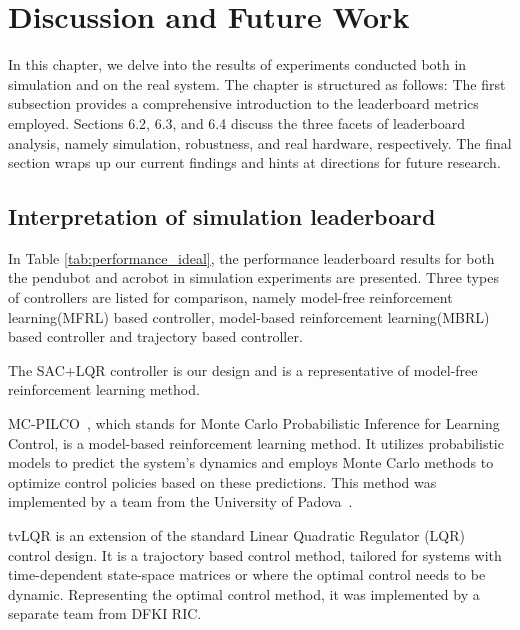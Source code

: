 \chapter{Discussion and Future Work}
In this chapter, we delve into the results of experiments conducted both in simulation and on the real system. The chapter is structured as follows: The first subsection provides a comprehensive introduction to the leaderboard metrics employed. Sections 6.2, 6.3, and 6.4 discuss the three facets of leaderboard analysis, namely simulation, robustness, and real hardware, respectively. The final section wraps up our current findings and hints at directions for future research.

\section{Interpretation of simulation leaderboard}
In Table \ref{tab:performance_ideal}, the performance leaderboard results for both the pendubot and acrobot in simulation experiments are presented. Three types of controllers are listed for comparison, namely model-free reinforcement learning(MFRL) based controller, model-based reinforcement learning(MBRL) based controller and trajectory based controller.

The SAC+LQR controller is our design and is a representative of model-free reinforcement learning method. 

MC-PILCO~\cite{amadio2022model}, which stands for Monte Carlo Probabilistic Inference for Learning Control, is a model-based reinforcement learning method. It utilizes probabilistic models to predict the system's dynamics and employs Monte Carlo methods to optimize control policies based on these predictions. This method was implemented by a team from the University of Padova~\cite{Libera2023AthleticIO}. 

tvLQR is an extension of the standard Linear Quadratic Regulator (LQR) control design. It is a trajoctory based control method, tailored for systems with time-dependent state-space matrices or where the optimal control needs to be dynamic. Representing the optimal control method, it was implemented by a separate team from DFKI RIC\cite{2023_ram_wiebe_double_pendulum}.

